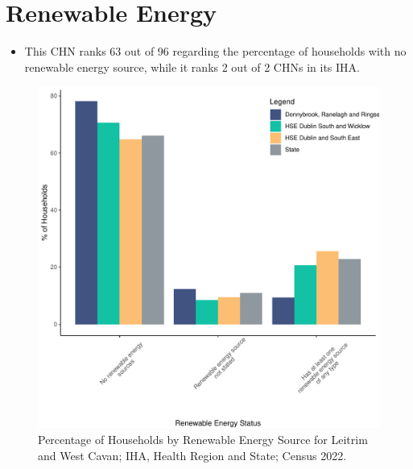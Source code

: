 \documentclass{article}
\begin{document}
\section{Renewable Energy}\label{sect:RE}
\begin{itemize}
\item This CHN ranks  63 out of 96 regarding the percentage of households with no renewable energy source, while it ranks   2 out of 2 CHNs in its IHA.
\end{itemize}
\begin{figure}[H]
	\centering
	\includegraphics[width = 140mm]{../figures/RenewableEnergyED.pdf}
	\caption{Percentage of Households by Renewable Energy Source for Leitrim and West Cavan; IHA, Health Region and State; Census 2022.}
	\label{fig:vbnv}
	\end{figure}
\end{document}

